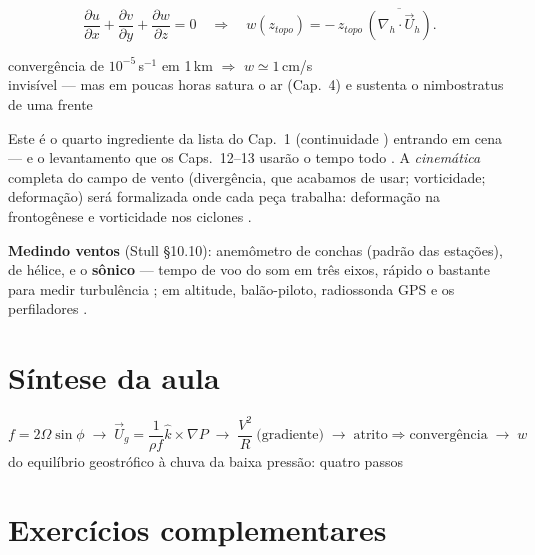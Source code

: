\documentclass[11pt]{article}
\begin{document}
\begin{formalivro}
\[ \frac{\partial u}{\partial x} + \frac{\partial v}{\partial y}
 + \frac{\partial w}{\partial z} = 0
\quad\Longrightarrow\quad
w(z_{topo}) = -\,z_{topo}\,
\overline{\left(\nabla_h\cdot\vec U_h\right)}. \]
\end{formalivro}

\begin{noquadro}
convergência de $10^{-5}$\,s$^{-1}$ em 1\,km $\Rightarrow$
$w \simeq 1$\,cm/s\\[2pt]
invisível — mas em poucas horas satura o ar (Cap.~4) e sustenta o
nimbostratus de uma frente
\end{noquadro}

Este é o quarto ingrediente da lista do Cap.~1 (continuidade
) entrando em cena — e o levantamento que os
Caps.~12--13 usarão o tempo todo .
A \emph{cinemática} completa do campo de vento (divergência, que
acabamos de usar; vorticidade; deformação) será formalizada onde cada
peça trabalha: deformação na frontogênese  e
vorticidade nos ciclones .

\textbf{Medindo ventos} (Stull \S10.10): anemômetro de conchas
(padrão das estações), de hélice, e o \textbf{sônico} — tempo de voo
do som em três eixos, rápido o bastante para medir turbulência
; em altitude, balão-piloto,
radiossonda GPS e os perfiladores .

\section{Síntese da aula}

\begin{noquadro}
\[ f = 2\Omega\sin\phi \;\to\;
   \vec U_g = \frac{1}{\rho f}\hat k\times\nabla P \;\to\;
   \frac{V^2}{R}\ \text{(gradiente)} \;\to\;
   \text{atrito}\Rightarrow\text{convergência} \;\to\; w \]
do equilíbrio geostrófico à chuva da baixa pressão: quatro passos
\end{noquadro}

\section{Exercícios complementares}\label{sec:exercicios}
\end{document}
